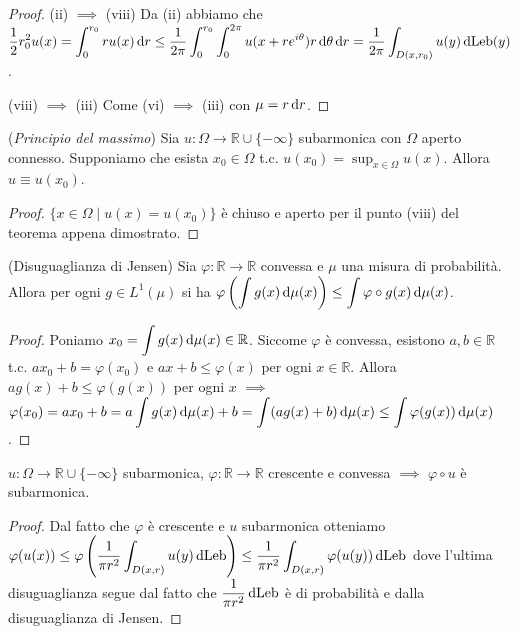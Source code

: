\begin{proof}
  (ii) $\implies$ (viii) Da (ii) abbiamo che $\displaystyle \frac{1}{2}r_0^2u(x)=\int_0^{r_0} ru(x)\mathop{}\!\mathrm{d} r \le \frac{1}{2\pi} \int_0^{r_0} \int_0^{2\pi} u(x+re^{i\theta}) r\mathop{}\!\mathrm{d}\theta\mathop{}\!\mathrm{d} r=\frac{1}{2\pi} \int_{D(x,r_0)} u(y)\mathop{}\!\mathrm{d}\text{Leb}(y)$.

  (viii) $\implies$ (iii) Come (vi) $\implies$ (iii) con $\mu=r\mathop{}\!\mathrm{d} r$.
\end{proof}

\begin{cor}
  (\textit{Principio del massimo}) Sia $u:\Omega \longrightarrow \mathbb{R}\cup\{-\infty\}$ subarmonica con $\Omega$ aperto connesso. Supponiamo che esista $x_0 \in \Omega$ t.c. $\displaystyle u(x_0)=\sup_{x \in \Omega} u(x)$. Allora $u \equiv u(x_0)$.
\end{cor}

\begin{proof}
  $\{x \in \Omega \mid u(x)=u(x_0)\}$ è chiuso e aperto per il punto (viii) del teorema appena dimostrato.
\end{proof}

\begin{lm}
  (Disuguaglianza di Jensen) Sia $\varphi:\mathbb{R} \longrightarrow \mathbb{R}$ convessa e $\mu$ una misura di probabilità. Allora per ogni $g \in L^1(\mu)$ si ha $\displaystyle \varphi\left(\int g(x)\mathop{}\!\mathrm{d}\mu(x)\right) \le \int \varphi\circ g(x)\mathop{}\!\mathrm{d}\mu(x)$.
\end{lm}

\begin{proof}
  Poniamo $\displaystyle x_0=\int g(x)\mathop{}\!\mathrm{d}\mu(x) \in \mathbb{R}$. Siccome $\varphi$ è convessa, esistono $a, b \in \mathbb{R}$ t.c. $ax_0+b=\varphi(x_0)$ e $ax+b \le \varphi(x)$ per ogni $x \in \mathbb{R}$.
  Allora $ag(x)+b \le \varphi(g(x))$ per ogni $x$ $\implies$ $\displaystyle \varphi(x_0)=ax_0+b=a\int g(x)\mathop{}\!\mathrm{d}\mu(x)+b=\int (ag(x)+b)\mathop{}\!\mathrm{d}\mu(x) \le \int \varphi(g(x))\mathop{}\!\mathrm{d}\mu(x)$.
\end{proof}

\begin{cor}
  $u:\Omega \longrightarrow \mathbb{R}\cup\{-\infty\}$ subarmonica, $\varphi:\mathbb{R}\longrightarrow \mathbb{R}$ crescente e convessa $\implies$ $\varphi\circ u$ è subarmonica.
\end{cor}

\begin{proof}
  Dal fatto che $\varphi$ è crescente e $u$ subarmonica otteniamo $\displaystyle \varphi(u(x)) \le \varphi\left(\frac{1}{\pi r^2}\int_{D(x,r)}u(y)\mathop{}\!\mathrm{d}\text{Leb}\right) \le \frac{1}{\pi r^2} \int_{D(x,r)} \varphi(u(y))\mathop{}\!\mathrm{d}\text{Leb}$ dove l'ultima disuguaglianza segue dal fatto che $\dfrac{1}{\pi r^2}\mathop{}\!\mathrm{d}\text{Leb}$ è di probabilità e dalla disuguaglianza di Jensen.
\end{proof}

